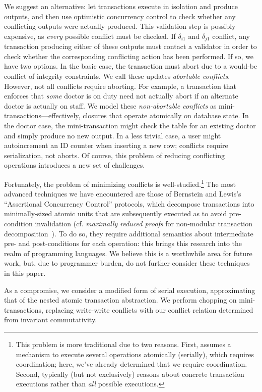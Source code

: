 We suggest an alternative: let transactions execute in isolation and
produce outputs, and then use optimistic concurrency control to check
whether any conflicting outputs were actually produced. This
validation step is possibly expensive, as \textit{every} possible
conflict must be checked. If $\delta_{i1}$ and $\delta_{j1}$ conflict,
any transaction producing either of these outputs must contact a
validator in order to check whether the corresponding conflicting
action has been performed. If so, we have two options. In the basic
case, the transaction must abort due to a would-be conflict of
integrity constraints. We call these updates \textit{abortable
  conflicts}. However, not all conflicts require aborting. For
example, a transaction that enforces that \textit{some} doctor is on
duty need not actually abort if an alternate doctor is actually on
staff. We model these \textit{non-abortable conflicts} as
mini-transactions---effectively, closures that operate atomically on
database state. In the doctor case, the mini-transaction might check
the table for an existing doctor and simply produce no new output. In
a less trivial case, a user might autoincrement an ID counter when
inserting a new row; conflicts require serialization, not aborts. Of
course, this problem of reducing conflicting operations introduces a
new set of challenges.

Fortunately, the problem of minimizing conflicts is
well-studied.\footnote{This problem is more traditional due to two
  reasons. First, assumes a mechanism to execute several operations
  atomically (serially), which requires coordination; here, we've
  already determined that we require coordination. Second, typically
  (but not exclusively) reasons about concrete transaction executions
  rather than \textit{all} possible executions.} The most advanced
techniques we have encountered are those of Bernstein and Lewis's
``Assertional Concurrency Control'' protocols, which decompose
transactions into minimally-sized atomic units that are subsequently
executed as to avoid pre-condition invalidation (cf. \textit{maximally
  reduced proofs} for non-modular transaction
decomposition~\cite{decomp-semantics}). To do so, they require
additional semantics about intermediate pre- and post-conditions for
each operation: this brings this research into the realm of
programming languages. We believe this is a worthwhile area for future
work, but, due to programmer burden, do not further consider these
techniques in this paper.

As a compromise, we consider a modified form of serial execution,
approximating that of the nested atomic transaction abstraction. We
perform chopping on mini-transactions, replacing write-write conflicts
with our conflict relation determined from invariant commutativity.

